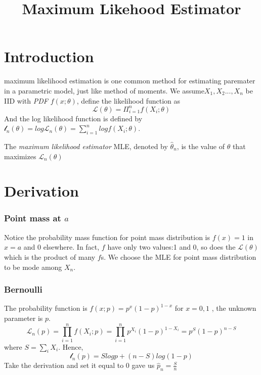 \documentclass[]{article}
\title{Maximum Likehood Estimator}
\author{}
\date{}
\begin{document}
\maketitle

\hypertarget{introduction}{%
\section{Introduction}\label{introduction}}

maximum likelihood estimation is one common method for estimating
paremater in a parametric model, just like method of moments. We
assume\(X_1, X_2..., X_n\) be IID with \emph{PDF} \(f(x;\theta)\),
define the likelihood function as \[
\mathcal{L}(\theta)=\Pi_{i=1}^nf(X_i;\theta)
\] And the log likelihood function is defined by
\(\mathcal{l}_n(\theta)=log \mathcal{L}_n(\theta)=\sum_{i=1}^n log f(X_i; \theta)\).

The \emph{maximum likelihood estimator} MLE, denoted by
\(\hat{\theta}_n\), is the value of \(\theta\) that maximizes
\(\mathcal{L}_n(\theta)\)

\hypertarget{derivation}{%
\section{Derivation}\label{derivation}}

\hypertarget{point-mass-at-a}{%
\subsubsection{\texorpdfstring{Point mass at
\(a\)}{Point mass at a}}\label{point-mass-at-a}}

Notice the probability mass function for point mass distribution is
\(f(x)=1\) in \(x=a\) and 0 elsewhere. In fact, \(f\) have only two
values:1 and 0, so does the \(\mathcal{L}(\theta)\) which is the product
of many \(f\)s. We choose the MLE for point mass distribution to be mode
among \(X_n\).

\hypertarget{bernoulli}{%
\subsubsection{Bernoulli}\label{bernoulli}}

The probability function is \(f(x;p)=p^x(1-p)^{1-x}\) for \(x=0,1\) ,
the unknown parameter is \(p\). \[
\mathcal{L}_n(p)=\prod_{i=1}^nf(X_i; p)=\prod_{i=1}^n p^{X_i}(1-p)^{1-X_i}=p^S(1-p)^{n-S}
\] where \(S=\sum_i X_i\). Hence, \[
\mathcal{l}_n(p)=S log p+ (n-S)log(1-p)
\] Take the derivation and set it equal to 0 gave us
\(\hat{p}_n=\frac{S}{n}\)
\end{document}
